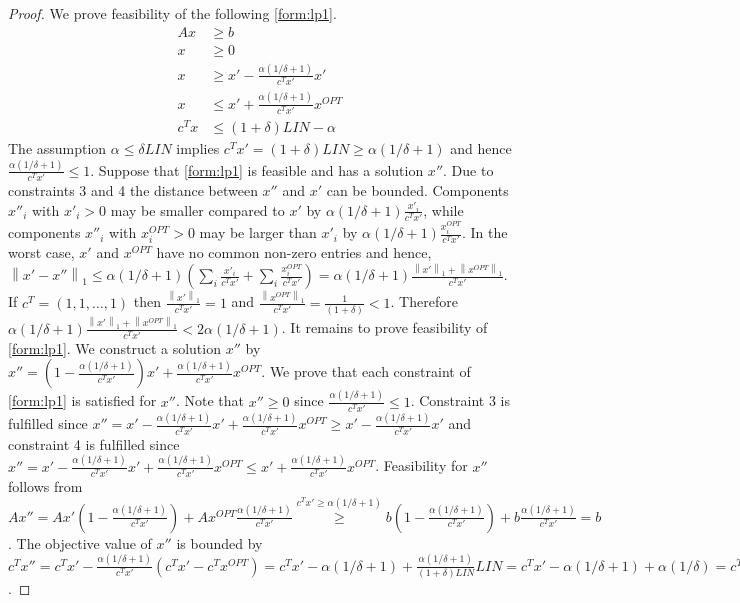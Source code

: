 \documentclass[a4paper,11pt]{article}
\newcommand{\nor}[1]{\left\|#1\right\|}
\begin{document}
\begin{proof}
   We prove feasibility of the following \ref{form:lp1}. 
  \begin{align*}
    \label{form:lp1}
    \tag{LP 1}
      Ax &\geq b\\
      x &\geq 0\\
      x &\geq x' -\frac{\alpha(1/\delta +1)}{c^T x'}x'\\
      x &\leq x' +\frac{\alpha(1/\delta +1)}{c^T x'}x^{\mathit{OPT}}\\
      c^T x & \leq (1+ \delta) \mathit{LIN} - \alpha
  \end{align*}
  The assumption $\alpha \leq \delta \mathit{LIN}$ implies $c^T x'= (1+\delta) \mathit{LIN} \geq \alpha(1/ \delta +1)$
   and hence $\frac{\alpha(1/\delta +1)}{c^T x'} \leq 1$.
  Suppose that \ref{form:lp1} is feasible and has a solution $x''$. Due to constraints 3 and 4 the distance between 
 $x''$ and $x'$ can be bounded. Components $x''_i$ with $x'_i > 0$ may be smaller compared to $x'$ by
  $\alpha(1/ \delta +1) \frac{x'_i}{c^T x'}$, while components $x''_i$ with
  $x_i^{\mathit{OPT}} >0$ may be larger than $x'_i$ by $\alpha(1/ \delta + 1)
  \frac{x^{\mathit{OPT}}_i} {{c^T x'}}$.
  In the worst case, $x'$ and $x^{\mathit{OPT}}$ have no common non-zero entries 
  and hence, $\nor{x' - x''}_1 \leq \alpha(1/ \delta +1) (\sum_i \frac{x'_i} {{c^T x'}} + 
  \sum_i \frac{x^{\mathit{OPT}}_i} {{c^T x'}}) = \alpha (1/ \delta +
  1) \frac{\nor{x'}_1+ \nor{x^{\mathit{OPT}}}_1}{c^T x'}$.
	If $c^T = (1,1, \ldots ,1)$ then $\frac{\nor{x'}_1}{c^T x'} = 1$ and $\frac{\nor{x^{\mathit{OPT}}}_1}{c^T x'}=
	\frac{1}{(1+\delta)} < 1$. Therefore  $\alpha (1/ \delta + 1) \frac{\nor{x'}_1+ \nor{x^{\mathit{OPT}}}_1}{c^T x'}
	< 2 \alpha (1/ \delta + 1)$.
  It remains to prove feasibility of \ref{form:lp1}.
  We construct a solution $x''$ by 
  $x'' = (1- \frac{\alpha(1/\delta +1)}{c^T x'})x' + \frac{\alpha(1/\delta +1)}{c^T x'}x^{\mathit{OPT}}$.
	We prove that each constraint of \ref{form:lp1}	is satisfied for $x''$. Note that $x'' \geq 0$ since
	$\frac{\alpha(1/\delta +1)}{c^T x'} \leq 1$.
	Constraint 3 is fulfilled since $x'' =  x' -\frac{\alpha(1/\delta +1)}{c^T x'}x' + 
	\frac{\alpha(1/\delta +1)}{c^T x'}x^{\mathit{OPT}} \geq x' -\frac{\alpha(1/\delta +1)}{c^T x'}x'$ and
	constraint 4 is fulfilled since $x'' = x' -\frac{\alpha(1/\delta +1)}{c^T x'}x' + 
	\frac{\alpha(1/\delta +1)}{c^T x'}x^{\mathit{OPT}} \leq x' + \frac{\alpha(1/\delta +1)}{c^T x'}x^{\mathit{OPT}}$.
  Feasibility for $x''$ follows from 
  $A x'' = Ax'(1 - \frac{\alpha(1/\delta +1)}{c^T x'}) + Ax^{\mathit{OPT}}\frac{\alpha(1/\delta +1)}{c^T x'}
  \stackrel{c^T x' \geq \alpha(1/\delta +1)}{\geq} b(1- \frac{\alpha(1/\delta +1)}{c^T x'}) + b \frac{\alpha(1/\delta +1)}{c^T x'} =b$.
  The objective value of $x''$ is bounded by
  $c^T x'' = c^T x' - \frac{\alpha(1/\delta +1)}{c^T x'}(c^T x' - c^T x^{\mathit{OPT}}) = 
  c^T x' - \alpha(1/\delta +1) + \frac{\alpha(1/\delta +1)}{(1+\delta) \mathit{LIN}} \mathit{LIN}
  = c^T x' - \alpha(1/\delta +1) + \alpha (1/\delta)
  = c^T x' - \alpha$.
\end{proof}
\end{document}
